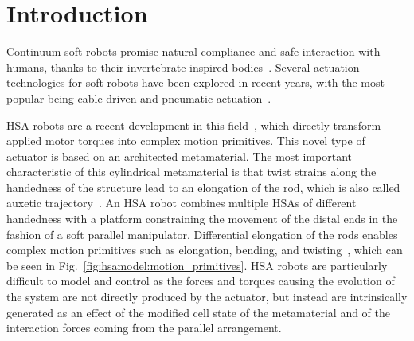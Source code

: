 \section{Introduction}\label{sec:hsamodel:introduction}

Continuum soft robots promise natural compliance and safe interaction with humans, thanks to their invertebrate-inspired bodies~\cite{della2020softencyclopedia}. Several actuation technologies for soft robots have been explored in recent years, with the most popular being cable-driven and pneumatic actuation~\cite{zaidi2021actuation}.

\gls{HSA} robots are a recent development in this field~\cite{chin2018compliant, truby2021recipe, zhang2022vision}, which directly transform applied motor torques into complex motion primitives. %
%
This novel type of actuator is based on an architected metamaterial. The most important characteristic of this cylindrical metamaterial is that twist strains along the handedness of the structure lead to an elongation of the rod, which is also called auxetic trajectory~\cite{good2022expanding}. 
An \gls{HSA} robot combines multiple \glspl{HSA} of different handedness with a platform constraining the movement of the distal ends in the fashion of a soft parallel manipulator. 
Differential elongation of the rods enables complex motion primitives such as elongation, bending, and twisting~\cite{chin2018compliant}, which can be seen in Fig.~\ref{fig:hsamodel:motion_primitives}. %
\gls{HSA} robots are particularly difficult to model and control as the forces and torques causing the evolution of the system are not directly produced by the actuator, but instead are intrinsically generated as an effect of the modified cell state of the metamaterial and of the interaction forces coming from the parallel arrangement.

